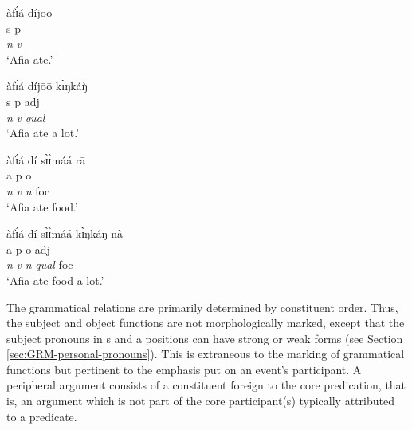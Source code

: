 





 \ea
\begin{multicols}{2}

\ea\label{ex:GRM-core-S-A-O}{
\glll àfɪ́á díjōō\\
 {\sc s}  {\sc p}\\
{\it n} {\it v}\\
\glt `Afia ate.'
}

\ex\label{ex:GRM-core-S-O}{
\glll àfɪ́á díjōō kɪ̀ŋkáŋ̀\\
 {\sc s}  {\sc p} {\sc adj} \\
{\it n} {\it v}  {\it qual}  \\
\glt `Afia ate a lot.'
}


\ex\label{ex:GRM-core-A-O}{
\glll àfɪ́á dí sɪ̀ɪ̀máá rā  \\
 {\sc a}  {\sc p}  {\sc o} {}\\
{\it n} {\it v} {\it n} {\sc foc}\\
\glt `Afia ate food.'
}

\ex\label{ex:GRM-core-A-O}{
\glll àfɪ́á dí sɪ̀ɪ̀máá  kɪ̀ŋkáŋ nà \\
 {\sc a}  {\sc p}  {\sc o}  {\sc adj}  {}\\
{\it n} {\it v} {\it n}  {\it qual} {\sc foc}  \\
\glt `Afia ate food a lot.'
}

\z 
\end{multicols}
 \z




The grammatical relations are primarily determined by
constituent order. Thus, the subject and object functions are not
morphologically
marked,  except that the subject pronouns in {\sc s} and {\sc a} positions  can 
have  strong or  weak forms (see Section \ref{sec:GRM-personal-pronouns}). This
is extraneous to the marking of grammatical functions but pertinent to the
emphasis put on  an  event's participant. A peripheral argument  consists of a
constituent foreign to the core predication, that is, an argument which is not
part of the core participant(s) typically attributed to a predicate.  


